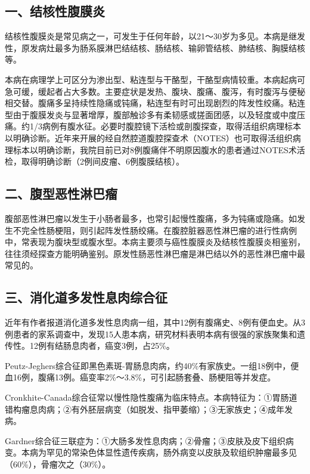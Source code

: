 \subsection{一、结核性腹膜炎}

结核性腹膜炎是常见病之一，可发生于任何年龄，以21～30岁为多见。本病是继发性，原发病灶最多为肠系膜淋巴结结核、肠结核、输卵管结核、肺结核、胸膜结核等。

本病在病理学上可区分为渗出型、粘连型与干酪型，干酪型病情较重。本病起病可急可缓，缓起者占大多数。主要症状是发热、腹块、腹痛、腹泻，有时腹泻与便秘相交替。腹痛多呈持续性隐痛或钝痛，粘连型有时可出现剧烈的阵发性绞痛。粘连型由于腹膜发炎与显著增厚，腹部触诊多有柔韧感或搓面团感，以及轻度或中度压痛。约1/3病例有腹水征。必要时腹腔镜下活检或剖腹探查，取得活组织病理标本以明确诊断。近年来开展的经自然腔道腹腔探查术（NOTES）也可取得活组织病理标本以明确诊断，我院目前已对8例腹痛伴不明原因腹水的患者通过NOTES术活检，取得明确诊断（2例间皮瘤、6例腹膜结核）。

\subsection{二、腹型恶性淋巴瘤}

腹部恶性淋巴瘤以发生于小肠者最多，也常引起慢性腹痛，多为钝痛或隐痛。如发生不完全性肠梗阻，则引起阵发性肠绞痛。在腹腔脏器恶性淋巴瘤的进行性病例中，常表现为腹块型或腹水型。本病主要须与癌性腹膜炎及结核性腹膜炎相鉴别，往往须经探查方能明确鉴别。原发性肠恶性淋巴瘤是淋巴结以外的恶性淋巴瘤中最常见的。

\subsection{三、消化道多发性息肉综合征}

近年有作者报道消化道多发性息肉病一组，其中12例有腹痛史、8例有便血史。从3例患者的家系调查中，发现15人患本病，研究材料表明本病有很强的家族聚集和遗传性。12例有结肠息肉者，癌变3例，占25\%。

Peutz-Jeghers综合征即黑色素斑-胃肠息肉病，约40\%有家族史。一组18例中，便血16例，腹痛13例。癌变率2\%～3.8\%，可引起肠套叠、肠梗阻等并发症。

Cronkhite-Canada综合征常以慢性隐性腹痛为临床特点。本病特征为：①胃肠道错构瘤息肉病；②有外胚层病变（如脱发、指甲萎缩）；③无家族史；④成年发病。

Gardner综合征三联症为：①大肠多发性息肉病；②骨瘤；③皮肤及皮下组织病变。本病为罕见的常染色体显性遗传疾病，肠外病变以皮肤及软组织肿瘤最多见（60\%），骨瘤次之（30\%）。

